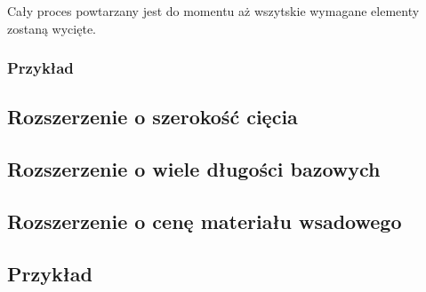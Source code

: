 Cały proces powtarzany jest do momentu aż wszytskie wymagane elementy zostaną wycięte.
\subsubsection{Przykład}
\subsection{Rozszerzenie o szerokość cięcia}
\subsection{Rozszerzenie o wiele długości bazowych}
\subsection{Rozszerzenie o cenę materiału wsadowego}
\subsection{Przykład}
